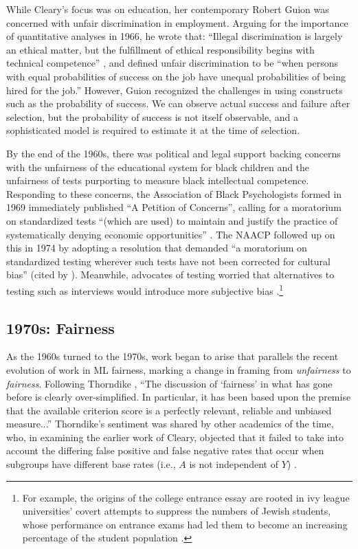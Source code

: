 \documentclass[sigconf,letterpaper,9pt]{acmart}
\begin{document}
While Cleary's focus was on education, her contemporary Robert Guion was 
concerned with unfair discrimination in employment. 
Arguing for the importance of quantitative analyses in 1966, he wrote that: ``Illegal discrimination is largely an ethical matter, but the fulfillment of ethical responsibility begins with technical competence'' \cite{guion1966employment}, 
and defined 
unfair discrimination to be 
``when persons with equal probabilities of success on the job have unequal probabilities of being hired for the job.'' However, Guion recognized the challenges in using constructs such as the probability of success. We can observe actual success and failure
after selection, but the probability of success is not itself observable, and  a sophisticated model is required to estimate it at the time of selection. 

By the end of the 1960s, there was political and legal support
backing concerns with the unfairness of the educational system for black children and the unfairness of tests
purporting to measure black intellectual competence.  Responding to these concerns, the Association of Black Psychologists formed in 1969 
immediately published ``A Petition of Concerns'',
 calling for a moratorium on standardized tests ``(which are used) to 
maintain and justify the practice of systematically denying
economic opportunities''
\cite{williams1980war}. 
The NAACP followed up on this in 1974 by adopting a resolution that demanded ``a moratorium on standardized testing wherever such tests have not been corrected for cultural bias'' (cited by \cite{samuda1998psychological}).
Meanwhile, advocates of testing
worried that alternatives to testing such as interviews
would introduce more subjective bias \cite{flaugher1974bias}.\footnote{
For example, the origins of the college entrance essay are rooted
in ivy league universities' covert attempts to suppress the numbers of Jewish students, whose performance on
entrance exams had led them to become an increasing
percentage of the student population \cite{karabel2006chosen}.}

\subsection{1970s: Fairness}\label{sec:70s}

As the 1960s turned to the 1970s, work began to arise that parallels the recent evolution of work in ML fairness, marking a change in framing from {\em unfairness} to {\em fairness}. 
Following Thorndike \cite{thorndike1971concepts}, ``The discussion of `fairness' in what has gone before is clearly over-simplified.
In particular, it has been based upon the premise that the available criterion score is a perfectly relevant, reliable and unbiased measure...''  Thorndike's  sentiment was shared by other academics of the time, who, in examining the earlier work of Cleary, objected that it failed to take into account the
differing false positive and false negative rates that occur
when subgroups have different base rates (i.e., $A$ is not independent of $Y$) \cite{thorndike1971concepts,einhorn1971methodological}.
\end{document}
